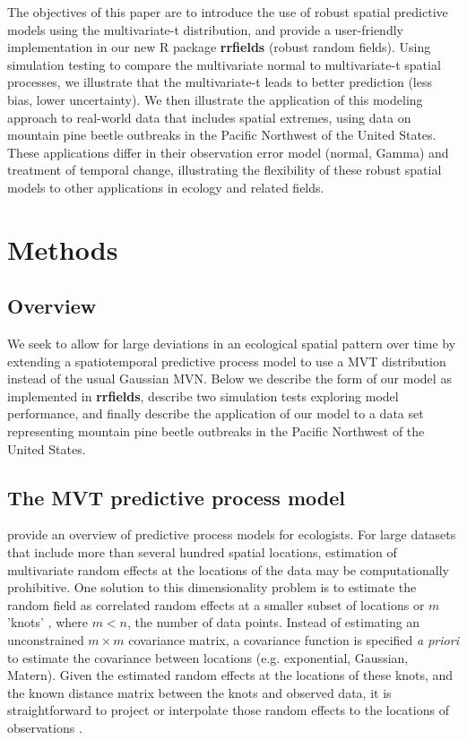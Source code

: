 \documentclass[12pt,english]{article}
\begin{document}
\begin{spacing}{1.25}
The objectives of this paper are to introduce the use of robust spatial
predictive models using the multivariate-t distribution, and provide a
user-friendly implementation in our new R package \textbf{rrfields}
(robust random fields). Using simulation testing to compare the multivariate
normal to multivariate-t spatial processes, we illustrate that the multivariate-t
leads to better prediction (less bias, lower uncertainty). We then illustrate
the application of this modeling approach to real-world data that includes
spatial extremes, using data on mountain pine beetle outbreaks in the Pacific
Northwest of the United States. These applications differ in their observation
error model (normal, Gamma) and treatment of temporal change, illustrating the
flexibility of these robust spatial models to other applications in ecology and
related fields.

\section{Methods}

\subsection{Overview}

We seek to allow for large deviations in an ecological spatial pattern over
time by extending a spatiotemporal predictive process model to use a MVT
distribution instead of the usual Gaussian MVN. Below we describe the form of our model
as implemented in \textbf{rrfields}, describe two simulation tests exploring model
performance, and finally describe the application of our model to a data set
representing mountain pine beetle outbreaks in the Pacific Northwest of the
United States.

\subsection{The MVT predictive process model}

\citet{latimer2009} provide an overview of predictive process models for
ecologists. For large datasets that include more than several hundred spatial
locations, estimation of multivariate random effects at the locations of the
data may be computationally prohibitive. One solution to this dimensionality
problem is to estimate the random field as correlated random effects at a
smaller subset of locations or $m$ 'knots' \citep[e.g.][]{latimer2009, shelton2014},
where $m < n$, the number of data points. Instead of estimating an
unconstrained $m \times m$ covariance matrix, a covariance function is
specified \emph{a priori} to estimate the covariance between locations (e.g. exponential,
Gaussian, Matern). Given the estimated random effects at the locations of these knots,
and the known distance matrix between the knots and observed data,
it is straightforward to project or interpolate those random effects to the
locations of observations \citep{latimer2009, finley2009}.


\end{spacing}
\end{document}

